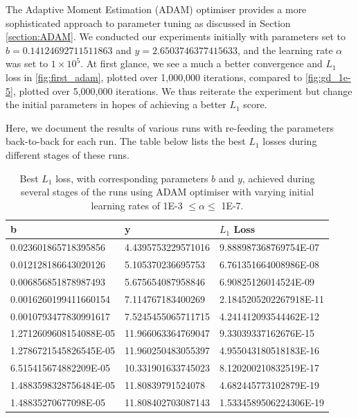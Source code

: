 \documentclass[a4paper]{report}
\begin{document}
The Adaptive Moment Estimation (ADAM) optimiser provides a more sophisticated approach to parameter tuning as discussed in Section \ref{section:ADAM}. We conducted our experiments initially with parameters set to $b = 0.14124692711511863$ and $y = 2.6503746377415633$, and the learning rate $\alpha$ was set to $1 \times 10^{5}$. At first glance, we see a much a better convergence and $L_1$ loss in \autoref{fig:first_adam}, plotted over 1,000,000 iterations, compared to \autoref{fig:gd_1e-5}, plotted over 5,000,000 iterations. We thus reiterate the experiment but change the initial parameters in hopes of achieving a better $L_1$ score. 

Here, we document the results of various runs with re-feeding the parameters back-to-back for each run. The table below lists the best $L_1$ losses during different stages of these runs.

\begin{table}[ht]
\centering
\begin{tabular}{|l|l|l|}
\hline
b & y & $L_1$ Loss \\
\hline
0.023601865718395856 & 4.4395753229571016 & 9.888987368769754E-07 \\
0.012128186643020126 & 5.105370236695753 & 6.761351664008986E-08 \\
0.006856851878987493 & 5.675654087958846 & 6.90825126014524E-09 \\
0.0016260199411660154 & 7.114767183400269 & 2.1845205202267918E-11 \\
0.0010793477830991617 & 7.5245455065711715 & 4.241412093544462E-12 \\
1.2712609608154088E-05 & 11.966063364769047 & 9.33039337162676E-15 \\
1.2786721545826545E-05 & 11.960250483055397 & 4.955043180518183E-16 \\
6.515415674882209E-05 & 10.331901633745023 & 8.120200210832519E-17 \\
1.4883598328756484E-05 & 11.80839791524078 & 4.682445773102879E-19 \\
1.48835270677098E-05 & 11.808402703087143 & 1.5334589506224306E-19 \\
\hline
\end{tabular}
\caption{Best $L_1$ loss, with corresponding parameters $b$ and $y$,  achieved during several stages of the runs using ADAM optimiser with varying initial learning rates of 1E-3 $\leq \alpha \leq$ 1E-7.}
\end{table}
\end{document}
